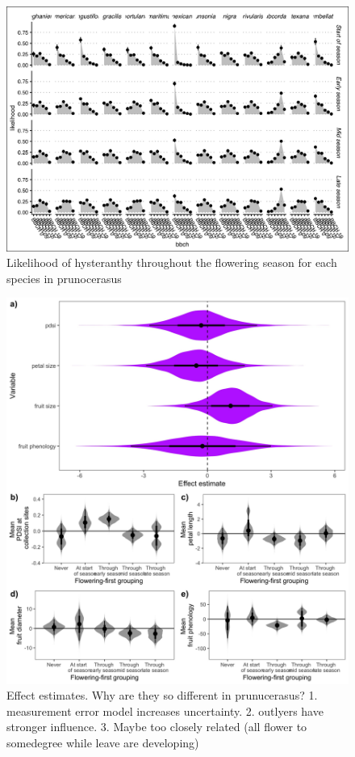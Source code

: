 \documentclass{article}\usepackage[]{graphicx}\usepackage[]{color}
\begin{document}
\begin{figure}[h!]
    \centering
 \includegraphics[width=\textwidth]{..//..//Plots/ord_quants.jpeg}
    \caption{ Likelihood of hysteranthy throughout the flowering season for each species in prunocerasus}
    \label{fig:plums}
\end{figure}

\begin{figure}[h!]
    \centering
 \includegraphics[width=\textwidth]{..//..//Plots/cerasus_mus.jpeg}
    \caption{Effect estimates. Why are they so different in prunucerasus? 1. measurement error model increases uncertainty. 2. outlyers have stronger influence. 3. Maybe too closely related (all flower to somedegree while leave are developing) }
    \label{fig:prunes}
\end{figure}
\end{document}

